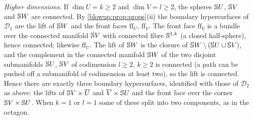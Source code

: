 \emph{Higher dimensions.} If $\dim U=k\ge2$ and $\dim V=l\ge2$, the spheres $\mathbb{S} U$, $\mathbb{S}
V$ and $\mathbb{S} W$ are connected. By \cref{blowup:prop:props}(ii) the boundary hypersurfaces of
$\mathcal D_1$ are the lift of $\mathbb{S} W$ and the front faces $\mathrm{ff}_U$, $\mathrm{ff}_V$. The front
face $\mathrm{ff}_V$ is a bundle over the connected manifold $\mathbb{S} V$ with connected fibre
$\mathbb{S}^{1,k}$ (a closed half-sphere), hence connected; likewise $\mathrm{ff}_U$. The lift of $\mathbb{S} W$
is the closure of $\mathbb{S} W\setminus(\mathbb{S} U\cup\mathbb{S} V)$, and the complement in the connected
manifold $\mathbb{S} W$ of the two disjoint submanifolds $\mathbb{S} U$, $\mathbb{S} V$ of codimension $l\ge2$,
$k\ge2$ is connected (a path can be pushed off a submanifold of codimension at least two), so the
lift is connected. Hence there are exactly three boundary hypersurfaces, identified with those
of $\mathcal D_2$ as above: the lifts of $\mathbb{S} V\times\overline{U}$ and $\overline{V}\times\mathbb{S} U$ and the front
face over the corner $\mathbb{S} V\times\mathbb{S} U$. When $k=1$ or $l=1$ some of these split into two
components, as in the octagon.
